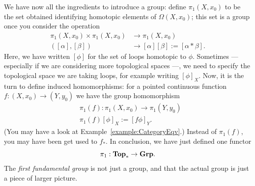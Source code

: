 \begin{example}
\begin{tcbitem}
  \end{tcbitem}
  We have now all the ingredients to introduce a group: define
  \(\pi_1(X, x_0)\) to be the set obtained identifying homotopic elements
  of \(\Omega(X, x_0)\); this set is a group once you consider the operation
  \begin{align*}
    \pi_1(X, x_0) \times \pi_1(X, x_0) &\to \pi_1(X, x_0) \\
    ([\alpha], [\beta]) &\to [\alpha][\beta] := [\alpha \ast \beta] .
  \end{align*}
  Here, we have written \([\phi]\) for the set of loops homotopic to
  \(\phi\). Sometimes --- especially if we are considering more topological
  spaces ---, we need to specify the topological space we are taking
  loops, for example writing \([\phi]_X\). Now, it is the turn to define
  induced homomorphisms: for a pointed continuous function
  \(f : (X, x_0) \to (Y, y_0)\) we have the group homomorphism
  \begin{align*}
    &\pi_1 (f) : \pi_1(X, x_0) \to \pi_1(Y, y_0) \\
    & \pi_1(f)[\phi]_X := [f \phi]_Y .
  \end{align*}
  (You may have a look at Example~\ref{example:CategoryEqv}.)  Instead
  of \(\pi_1(f)\), you may have been get used to \(f_\ast\). In conclusion,
  we have just defined one functor
  \[
    \pi_1 : \mathbf{Top}_\ast \to \mathbf{Grp} .
  \]
  The {\em first fundamental group} is not just a group, and that the
  actual group is just a piece of larger picture.
\end{example}

